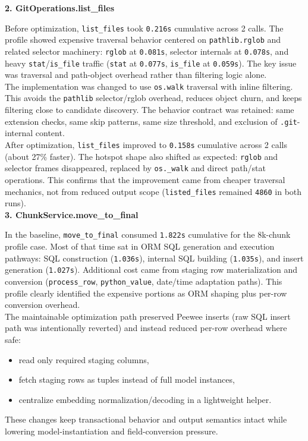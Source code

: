 \documentclass[a4paper,12pt]{article}
\begin{document}
\textbf{2. GitOperations.list\_files}

Before optimization, \texttt{list\_files} took \texttt{0.216s} cumulative across 2 calls. The profile showed expensive traversal behavior centered on \texttt{pathlib.rglob} and related selector machinery: \texttt{rglob} at \texttt{0.081s}, selector internals at \texttt{0.078s}, and heavy \texttt{stat}/\texttt{is\_file} traffic (\texttt{stat} at \texttt{0.077s}, \texttt{is\_file} at \texttt{0.059s}). The key issue was traversal and path-object overhead rather than filtering logic alone. \\

The implementation was changed to use \texttt{os.walk} traversal with inline filtering. This avoids the \texttt{pathlib} selector/rglob overhead, reduces object churn, and keeps filtering close to candidate discovery. The behavior contract was retained: same extension checks, same skip patterns, same size threshold, and exclusion of \texttt{.git}-internal content. \\

After optimization, \texttt{list\_files} improved to \texttt{0.158s} cumulative across 2 calls (about 27\% faster). The hotspot shape also shifted as expected: \texttt{rglob} and selector frames disappeared, replaced by \texttt{os.\_walk} and direct path/stat operations. This confirms that the improvement came from cheaper traversal mechanics, not from reduced output scope (\texttt{listed\_files} remained \texttt{4860} in both runs). \\

\textbf{3. ChunkService.move\_to\_final}

In the baseline, \texttt{move\_to\_final} consumed \texttt{1.822s} cumulative for the 8k-chunk profile case. Most of that time sat in ORM SQL generation and execution pathways: SQL construction (\texttt{1.036s}), internal SQL building (\texttt{1.035s}), and insert generation (\texttt{1.027s}). Additional cost came from staging row materialization and conversion (\texttt{process\_row}, \texttt{python\_value}, date/time adaptation paths). This profile clearly identified the expensive portions as ORM shaping plus per-row conversion overhead. \\

The maintainable optimization path preserved Peewee inserts (raw SQL insert path was intentionally reverted) and instead reduced per-row overhead where safe:
\begin{itemize}
\item read only required staging columns,
\item fetch staging rows as tuples instead of full model instances,
\item centralize embedding normalization/decoding in a lightweight helper.
\end{itemize}
These changes keep transactional behavior and output semantics intact while lowering model-instantiation and field-conversion pressure. \\
\end{document}
